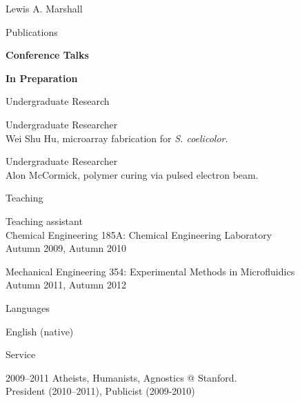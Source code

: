 \documentclass{article}
\begin{document}
\begin{cv}{Lewis A. Marshall}
\begin{cvlist}{Publications}

  \item \textbf{Conference Talks} 



  \item \textbf{In Preparation} 

\end{cvlist}



  \begin{cvlist}{Undergraduate Research}
    \item Undergraduate Researcher\\
		Wei Shu Hu, microarray fabrication for \emph{S. coelicolor}. 
		
	\item Undergraduate Researcher\\
		Alon McCormick, polymer curing via pulsed electron beam.
  \end{cvlist}


  \begin{cvlist}{Teaching}
    \item Teaching assistant\\
      Chemical Engineering 185A: Chemical Engineering Laboratory\\
      Autumn 2009, Autumn 2010

		Mechanical Engineering 354: Experimental Methods in Microfluidics\\
		Autumn 2011, Autumn 2012
  \end{cvlist}
  
  \begin{cvlist}{Languages}
    \item English (native)\\
  \end{cvlist}
  
  \begin{cvlist}{Service}
    \item[2009--2011] Atheists, Humanists, Agnostics @ Stanford.\\
      President (2010--2011), Publicist (2009-2010)\\


\end{cvlist}
\end{cv}
\end{document}
